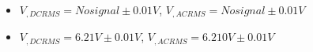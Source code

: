 \begin{itemize}
     \item $V_{, DCRMS}=No signal\pm 0.01\unit{V}$, $V_{, ACRMS}=No signal\pm 0.01\unit{V}$ 
     \item $V_{, DCRMS}=6.21V\pm 0.01\unit{V}$, $V_{, ACRMS}=6.210V\pm 0.01\unit{V}$\\
\end{itemize}